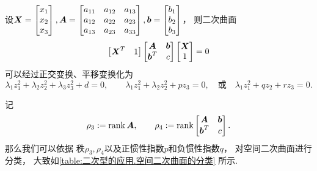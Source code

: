 \begin{theorem}[空间二次曲面的分类定理]
设\(\boldsymbol{X} = \begin{bmatrix}
	x_1 \\ x_2 \\ x_3
\end{bmatrix},
\boldsymbol{A} = \begin{bmatrix}
	a_{11} & a_{12} & a_{13} \\
	a_{12} & a_{22} & a_{23} \\
	a_{13} & a_{23} & a_{33}
\end{bmatrix},
\boldsymbol{b} = \begin{bmatrix}
	b_1 \\ b_2 \\ b_3
\end{bmatrix}\)，
则二次曲面\begin{equation*}
	\begin{bmatrix}
		\boldsymbol{X}^T & 1
	\end{bmatrix}
	\begin{bmatrix}
		\boldsymbol{A} & \boldsymbol{b} \\
		\boldsymbol{b}^T & c
	\end{bmatrix}
	\begin{bmatrix}
		\boldsymbol{X} \\ 1
	\end{bmatrix}
	= 0
\end{equation*}可以经过正交变换、平移变换化为\begin{equation*}
	\lambda_1 z_1^2 + \lambda_2 z_2^2 + \lambda_3 z_3^2 + d = 0,
	\qquad
	\lambda_1 z_1^2 + \lambda_2 z_2^2 + p z_3 = 0,
	\quad\text{或}\quad
	\lambda_1 z_1^2 + q z_2 + r z_3 = 0.
\end{equation*}
\end{theorem}

记\begin{equation*}
	\rho_3 := \rank\boldsymbol{A},
	\qquad
	\rho_4 := \rank\begin{bmatrix}
		\boldsymbol{A} & \boldsymbol{b} \\
		\boldsymbol{b}^T & c
	\end{bmatrix}.
\end{equation*}
那么我们可以依据
秩\(\rho_3,\rho_4\)以及正惯性指数\(p\)和负惯性指数\(q\)，
对空间二次曲面进行分类，
大致如\cref{table:二次型的应用.空间二次曲面的分类} 所示.

